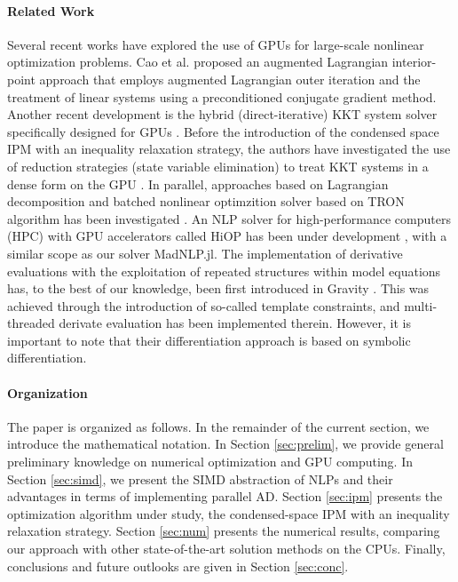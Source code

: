 \paragraph*{Related Work}
Several recent works have explored the use of GPUs for large-scale
nonlinear optimization problems. Cao et al. \cite{cao2016augmented}
proposed an augmented Lagrangian interior-point approach that employs
augmented Lagrangian outer iteration and the treatment of linear
systems using a preconditioned conjugate gradient method.  Another
recent development is the hybrid (direct-iterative) KKT system solver
specifically designed for GPUs \cite{regev2023hykkt}.  Before the
introduction of the condensed space IPM with an inequality relaxation
strategy, the authors have investigated the use of reduction
strategies (state variable elimination) to treat KKT systems in a
dense form on the GPU
\cite{pacaud2023parallel,pacaud2022feasible,pacaud2023accelerating,cole2023exploiting}.
In parallel, approaches based on Lagrangian decomposition and
batched nonlinear optimzition solver based on TRON algorithm \cite{lin1999newton}
has been investigated \cite{kim2022accelerated,kim2021leveraging}.
An NLP solver for high-performance computers (HPC) with GPU
accelerators called HiOP has been under development
\cite{hiop_techrep}, with a similar scope as our solver MadNLP.jl.
The implementation of derivative evaluations with the exploitation of
repeated structures within model equations has, to the best of our
knowledge, been first introduced in Gravity \cite{Gravity}. This was
achieved through the introduction of so-called template constraints,
and multi-threaded derivate evaluation has been implemented therein.
However, it is important to note that their differentiation approach
is based on symbolic differentiation.


\paragraph*{Organization}
The paper is organized as follows. In the remainder of the current
section, we introduce the mathematical notation. In Section
\ref{sec:prelim}, we provide general preliminary knowledge on
numerical optimization and GPU computing. In Section \ref{sec:simd},
we present the SIMD abstraction of NLPs and their advantages in terms
of implementing parallel AD. Section \ref{sec:ipm} presents the
optimization algorithm under study, the condensed-space IPM with an
inequality relaxation strategy. Section \ref{sec:num} presents the
numerical results, comparing our approach with other state-of-the-art
solution methods on the CPUs. Finally, conclusions and future outlooks
are given in Section \ref{sec:conc}.

